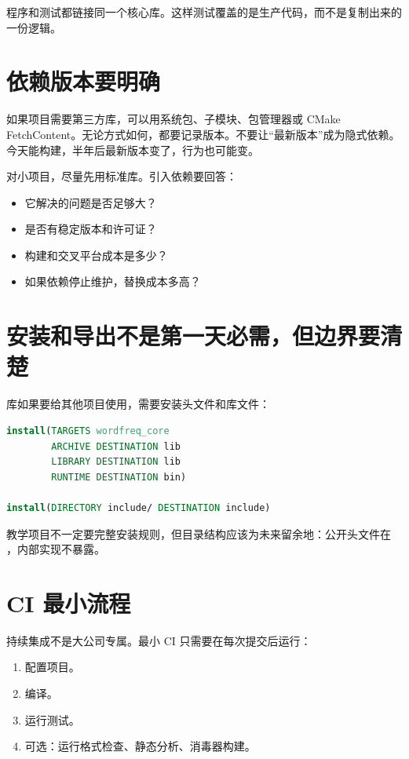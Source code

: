 程序和测试都链接同一个核心库。这样测试覆盖的是生产代码，而不是复制出来的一份逻辑。

\section{依赖版本要明确}

如果项目需要第三方库，可以用系统包、子模块、包管理器或 CMake FetchContent。无论方式如何，都要记录版本。不要让“最新版本”成为隐式依赖。今天能构建，半年后最新版本变了，行为也可能变。

对小项目，尽量先用标准库。引入依赖要回答：

\begin{itemize}
  \item 它解决的问题是否足够大？
  \item 是否有稳定版本和许可证？
  \item 构建和交叉平台成本是多少？
  \item 如果依赖停止维护，替换成本多高？
\end{itemize}

\section{安装和导出不是第一天必需，但边界要清楚}

库如果要给其他项目使用，需要安装头文件和库文件：

\begin{lstlisting}[language=CMake,caption={安装目标示意}]
install(TARGETS wordfreq_core
        ARCHIVE DESTINATION lib
        LIBRARY DESTINATION lib
        RUNTIME DESTINATION bin)

install(DIRECTORY include/ DESTINATION include)
\end{lstlisting}

教学项目不一定要完整安装规则，但目录结构应该为未来留余地：公开头文件在 ，内部实现不暴露。

\section{CI 最小流程}

持续集成不是大公司专属。最小 CI 只需要在每次提交后运行：

\begin{enumerate}
  \item 配置项目。
  \item 编译。
  \item 运行测试。
  \item 可选：运行格式检查、静态分析、消毒器构建。
\end{enumerate}

